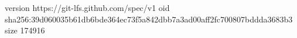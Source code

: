 version https://git-lfs.github.com/spec/v1
oid sha256:39d060035b61db6bde364ec73f5a842dbb7a3ad00aff2fc700807bddda3683b3
size 174916
